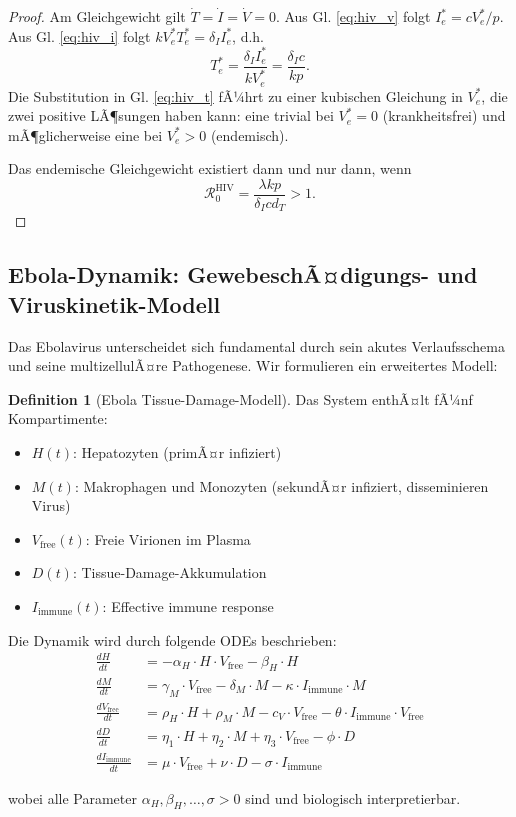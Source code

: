 ﻿\documentclass[a4paper,12pt]{article}
\theoremstyle{definition}
\newtheorem{definition}{Definition}
\begin{document}
\begin{proof}
Am Gleichgewicht gilt $\dot{T} = \dot{I} = \dot{V} = 0$. Aus Gl. \eqref{eq:hiv_v} folgt $I_e^* = c V_e^* / p$. Aus Gl. \eqref{eq:hiv_i} folgt $k V_e^* T_e^* = \delta_I I_e^*$, d.h.
\[
T_e^* = \frac{\delta_I I_e^*}{k V_e^*} = \frac{\delta_I c}{k p}.
\]
Die Substitution in Gl. \eqref{eq:hiv_t} fÃ¼hrt zu einer kubischen Gleichung in $V_e^*$, die zwei positive LÃ¶sungen haben kann: eine trivial bei $V_e^* = 0$ (krankheitsfrei) und mÃ¶glicherweise eine bei $V_e^* > 0$ (endemisch).

Das endemische Gleichgewicht existiert dann und nur dann, wenn
\[
\mathcal{R}_0^{\text{HIV}} = \frac{\lambda k p}{\delta_I c d_T} > 1.
\]
\end{proof}

\subsection{Ebola-Dynamik: GewebeschÃ¤digungs- und Viruskinetik-Modell}

Das Ebolavirus unterscheidet sich fundamental durch sein akutes Verlaufsschema und seine multizellulÃ¤re Pathogenese. Wir formulieren ein erweitertes Modell:

\begin{definition}[Ebola Tissue-Damage-Modell]
Das System enthÃ¤lt fÃ¼nf Kompartimente:
\begin{itemize}
\item $H(t)$: Hepatozyten (primÃ¤r infiziert)
\item $M(t)$: Makrophagen und Monozyten (sekundÃ¤r infiziert, disseminieren Virus)
\item $V_{\text{free}}(t)$: Freie Virionen im Plasma
\item $D(t)$: Tissue-Damage-Akkumulation
\item $I_{\text{immune}}(t)$: Effective immune response
\end{itemize}

Die Dynamik wird durch folgende ODEs beschrieben:
\begin{align}
\frac{dH}{dt} &= -\alpha_H \cdot H \cdot V_{\text{free}} - \beta_H \cdot H \label{eq:ebola_h}\\
\frac{dM}{dt} &= \gamma_M \cdot V_{\text{free}} - \delta_M \cdot M - \kappa \cdot I_{\text{immune}} \cdot M \label{eq:ebola_m}\\
\frac{dV_{\text{free}}}{dt} &= \rho_H \cdot H + \rho_M \cdot M - c_V \cdot V_{\text{free}} - \theta \cdot I_{\text{immune}} \cdot V_{\text{free}} \label{eq:ebola_v}\\
\frac{dD}{dt} &= \eta_1 \cdot H + \eta_2 \cdot M + \eta_3 \cdot V_{\text{free}} - \phi \cdot D \label{eq:ebola_d}\\
\frac{dI_{\text{immune}}}{dt} &= \mu \cdot V_{\text{free}} + \nu \cdot D - \sigma \cdot I_{\text{immune}} \label{eq:ebola_immune}
\end{align}

wobei alle Parameter $\alpha_H, \beta_H, \ldots, \sigma > 0$ sind und biologisch interpretierbar.
\end{definition}
\end{document}
